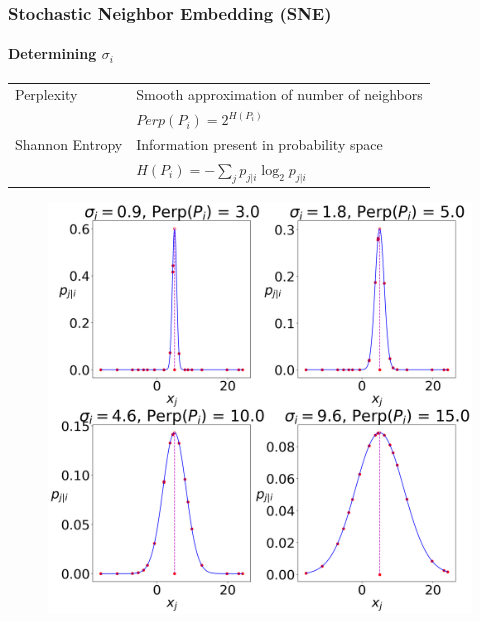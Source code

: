\documentclass{beamer}
\begin{document}
\begin{frame}
  \frametitle{Stochastic Neighbor Embedding (SNE)}
  \framesubtitle{Determining $\sigma_i$}

  \begin{center}
    \small
    
    \begin{tabular}{ll}
      Perplexity & Smooth approximation of number of neighbors\\
      & $Perp(P_i) = 2^{H(P_i)}$\\
      \hline
      Shannon Entropy & Information present in probability space\\
      & $H(P_i) = -\sum_j p_{j|i} \log_2{p_{j|i}}$\\
    \end{tabular}
  \end{center}
  
  \begin{figure}
    \centering
    \includegraphics[height=0.6\textheight]{images/perp/perp.png}
  \end{figure}
\end{frame}
\end{document}
